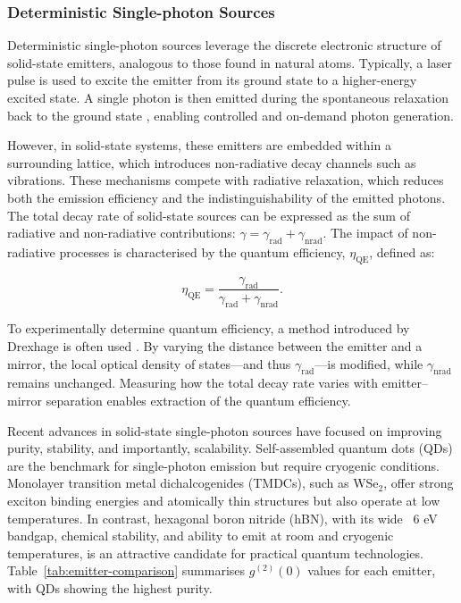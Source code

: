 \subsubsection{Deterministic Single-photon Sources \label{sec:det-source}}

Deterministic single-photon sources leverage the discrete electronic structure of solid-state emitters, analogous to those found in natural atoms. Typically, a laser pulse is used to excite the emitter from its ground state to a higher-energy excited state. A single photon is then emitted during the spontaneous relaxation back to the ground state \cite{Weisskopf1930}, enabling controlled and on-demand photon generation.

However, in solid-state systems, these emitters are embedded within a surrounding lattice, which introduces non-radiative decay channels such as vibrations. These mechanisms compete with radiative relaxation, which reduces both the emission efficiency and the indistinguishability of the emitted photons. The total decay rate of solid-state sources can be expressed as the sum of radiative and non-radiative contributions: $\gamma = \gamma_{\mathrm{rad}} + \gamma_{\mathrm{nrad}}$. The impact of non-radiative processes is characterised by the quantum efficiency, $\eta_{\mathrm{QE}}$, defined as:

\begin{equation}
    \eta_{\mathrm{QE}} = \frac{\gamma_{\mathrm{rad}}}{\gamma_{\mathrm{rad}} + \gamma_{\mathrm{nrad}}}.
    \label{eqn:qe}
\end{equation}

To experimentally determine quantum efficiency, a method introduced by Drexhage is often used \cite{Tews1970, Drexhage1968}. By varying the distance between the emitter and a mirror, the local optical density of states—and thus $\gamma_{\mathrm{rad}}$—is modified, while $\gamma_{\mathrm{nrad}}$ remains unchanged. Measuring how the total decay rate varies with emitter–mirror separation enables extraction of the quantum efficiency.


Recent advances in solid-state single-photon sources have focused on improving purity, stability, and importantly, scalability. Self-assembled quantum dots (QDs) are the benchmark for single-photon emission but require cryogenic conditions. Monolayer transition metal dichalcogenides (TMDCs), such as WSe$_2$, offer strong exciton binding energies and atomically thin structures but also operate at low temperatures. In contrast, hexagonal boron nitride (hBN), with its wide ~6 eV bandgap, chemical stability, and ability to emit at room and cryogenic temperatures, is an attractive candidate for practical quantum technologies. Table~\ref{tab:emitter-comparison} summarises $g^{(2)}(0)$ values for each emitter, with QDs showing the highest purity.


